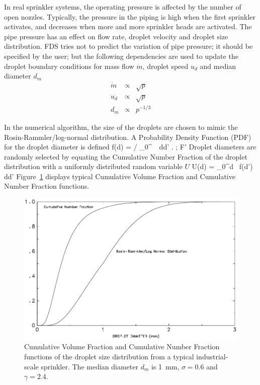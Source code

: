 In real sprinkler systems, the operating pressure is affected by the number of open nozzles. Typically, the pressure
in the piping is high when the first sprinkler activates, and
decreases when more and more sprinkler heads are activated. The pipe pressure has an effect on
flow rate, droplet velocity and droplet size distribution. FDS tries
not to predict the variation of pipe pressure; it should be specified
by the user; but the following dependencies are used to update the
droplet boundary conditions for mass flow $\dot{m}$, droplet speed
$u_d$ and median diameter $d_m$
\begin{eqnarray}
    \dot{m} & \propto & \sqrt{p} \\
    u_d & \propto & \sqrt{p} \\
    d_m & \propto & p^{-1/3}
\end{eqnarray}

In the numerical algorithm,
the size of the droplets are chosen to mimic the
Rosin-Rammler/log-normal distribution. A Probability Density Function (PDF)
for the droplet diameter is defined
\be f(d) =   \left/ \int_0^\infty \, 
     \, \mbox{d}d' \right. \quad ; \quad F' \equiv {}   \ee
Droplet diameters are randomly selected by equating the Cumulative
Number Fraction of the droplet distribution with a uniformly
distributed random variable $U$
\be U(d) = \int_0^d \, f(d') \, \mbox{d}d'  \label{Ud}  \ee
Figure~\ref{rosin} displays typical Cumulative Volume Fraction and
Cumulative Number Fraction functions.
\begin{figure}[t]
\begin{center}
\includegraphics[width=4.5in]{FIGURES/rosin}
\caption[Liquid droplet size distribution]{Cumulative Volume Fraction and Cumulative Number
Fraction functions of the droplet size distribution from
a typical industrial-scale sprinkler. The median diameter $d_m$ is
1~mm, $\sigma=0.6$ and $\gamma=2.4$.}
\label{rosin}
\end{center}
\end{figure}

